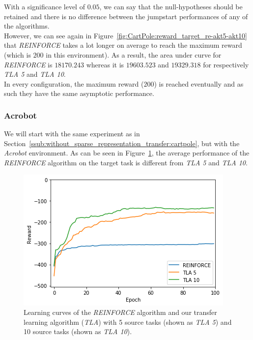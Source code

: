 With a significance level of $0.05$, we can say that the null-hypotheses should be retained and there is no difference between the jumpstart performances of any of the algorithms.\\
However, we can see again in Figure~\ref{fig:CartPole:reward_target_re-akt5-akt10} that \textit{REINFORCE} takes a lot longer on average to reach the maximum reward (which is $200$ in this environment). As a result, the area under curve for \textit{REINFORCE} is $18170.243$ whereas it is $19603.523$ and $19329.318$ for respectively \textit{TLA 5} and \textit{TLA 10}.\\
In every configuration, the maximum reward ($200$) is reached eventually and as such they have the same asymptotic performance.\\

\subsubsection{Acrobot} %
\label{ssub:without_sparse_representation_transfer:acrobot}
We will start with the same experiment as in Section~\ref{ssub:without_sparse_representation_transfer:cartpole}, but with the \textit{Acrobot} environment.
As can be seen in Figure~\ref{fig:Acrobot:reward_target_re-akt5-akt10}, the average performance of  the \textit{REINFORCE} algorithm on the target task is different from \textit{TLA 5} and \textit{TLA 10}.
\begin{figure}[H]
    \centering
    \includegraphics[width=.8\linewidth]{images/results/Acrobot/no_sparse_transfer/reward_target_re-akt5-akt10.png}
    \caption[Learning curves for the \textit{Acrobot} environment of \textit{REINFORCE} and \textit{TLA} for the \emph{Acrobot} environment]{Learning curves of the \textit{REINFORCE} algorithm and our transfer learning algorithm (\textit{TLA}) with 5 source tasks (shown as \textit{TLA 5}) and 10 source tasks (shown as \textit{TLA 10}).}
    \label{fig:Acrobot:reward_target_re-akt5-akt10}
\end{figure}

